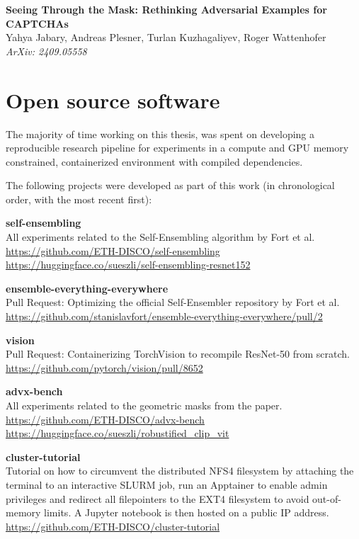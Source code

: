 \documentclass[a4paper, oneside]{discothesis}
\newcommand{\linebreaks}{\vspace*{0.5em}}
\begin{document}
\textbf{Seeing Through the Mask: Rethinking Adversarial Examples for CAPTCHAs} \\
Yahya Jabary, Andreas Plesner, Turlan Kuzhagaliyev, Roger Wattenhofer \\
\textit{ArXiv: 2409.05558}

\section*{Open source software}

The majority of time working on this thesis, was spent on developing a reproducible research pipeline for experiments in a compute and GPU memory constrained, containerized environment with compiled dependencies.

The following projects were developed as part of this work (in chronological order, with the most recent first):

\linebreaks

\textbf{self-ensembling} \\
All experiments related to the Self-Ensembling algorithm by Fort et al. \\
\url{https://github.com/ETH-DISCO/self-ensembling} \\
\url{https://huggingface.co/sueszli/self-ensembling-resnet152}

\linebreaks

\textbf{ensemble-everything-everywhere} \\
Pull Request: Optimizing the official Self-Ensembler repository by Fort et al. \\
\url{https://github.com/stanislavfort/ensemble-everything-everywhere/pull/2}

\linebreaks

\textbf{vision} \\
Pull Request: Containerizing TorchVision to recompile ResNet-50 from scratch. \\
\url{https://github.com/pytorch/vision/pull/8652}

\linebreaks

\textbf{advx-bench} \\
All experiments related to the geometric masks from the paper. \\
\url{https://github.com/ETH-DISCO/advx-bench} \\
\url{https://huggingface.co/sueszli/robustified_clip_vit}

\linebreaks

\textbf{cluster-tutorial} \\
Tutorial on how to circumvent the distributed NFS4 filesystem by attaching the terminal to an interactive SLURM job, run an Apptainer to enable admin privileges and redirect all filepointers to the EXT4 filesystem to avoid out-of-memory limits. A Jupyter notebook is then hosted on a public IP address. \\
\url{https://github.com/ETH-DISCO/cluster-tutorial}
\end{document}
